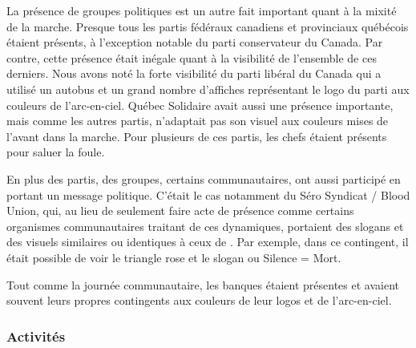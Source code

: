 La présence de groupes politiques est un autre fait important quant à la mixité de la marche.
Presque tous les partis fédéraux canadiens et provinciaux québécois étaient présents, à l'exception notable du parti conservateur du Canada.
Par contre, cette présence était inégale quant à la visibilité de l'ensemble de ces derniers.
Nous avons noté la forte visibilité du parti libéral du Canada qui a utilisé un autobus et un grand nombre d'affiches représentant le logo du parti aux couleurs de l'arc-en-ciel.
Québec Solidaire avait aussi une présence importante, mais comme les autres partis, n'adaptait pas son visuel aux couleurs mises de l'avant dans la marche.
Pour plusieurs de ces partis, les chefs étaient présents pour saluer la foule.

En plus des partis, des groupes, certains communautaires, ont aussi participé en portant un message politique.
C'était le cas notamment du Séro Syndicat / Blood Union, qui, au lieu de seulement faire acte de présence comme certains organismes communautaires traitant de ces dynamiques, portaient des slogans et des visuels similaires ou identiques à ceux de .
Par exemple, dans ce contingent, il était possible de voir le triangle rose et le slogan  ou Silence = Mort.

Tout comme la journée communautaire, les banques étaient présentes et avaient souvent leurs propres contingents aux couleurs de leur logos et de l'arc-en-ciel.
\subsubsection{Activités}
\label{subsec:activitesfiertemontreal}



